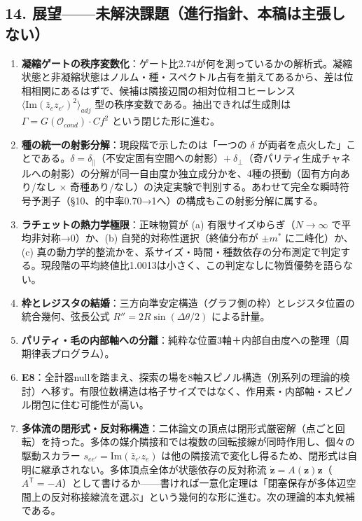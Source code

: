 \documentclass[
  a4paper,
]{ltjsarticle}
\providecommand{\tightlist}{%
  \setlength{\itemsep}{0pt}\setlength{\parskip}{0pt}}
\begin{document}
\subsection{14.
展望------未解決課題（進行指針、本稿は主張しない）}\label{ux5c55ux671bux672aux89e3ux6c7aux8ab2ux984cux9032ux884cux6307ux91ddux672cux7a3fux306fux4e3bux5f35ux3057ux306aux3044}

\begin{enumerate}
\def\labelenumi{\arabic{enumi}.}
\tightlist
\item
  \textbf{凝縮ゲートの秩序変数化}：ゲート比2.74が何を測っているかの解析式。凝縮状態と非凝縮状態はノルム・種・スペクトル占有を揃えてあるから、差は位相相関にあるはずで、候補は隣接辺間の相対位相コヒーレンス
  \(\langle \mathrm{Im}(\bar z_e z_{e'})^2\rangle_{adj}\)
  型の秩序変数である。抽出できれば生成則は
  \(\Gamma = G(\mathcal{O}_{cond})\cdot Cf^2\) という閉じた形に進む。
\item
  \textbf{種の統一の射影分解}：現段階で示したのは「一つの \(\delta\)
  が両者を点火した」ことである。\(\delta = \delta_\parallel\)（不安定固有空間への射影）\(+\ \delta_\perp\)（奇パリティ生成チャネルへの射影）の分解が同一自由度か独立成分かを、4種の摂動（固有方向あり/なし
  ×
  奇種あり/なし）の決定実験で判別する。あわせて完全な瞬時符号予測子（§10、的中率0.70→1へ）の構成もこの射影分解に属する。
\item
  \textbf{ラチェットの熱力学極限}：正味物質が (a)
  有限サイズゆらぎ（\(N\to\infty\) で平均非対称→0）か、(b)
  自発的対称性選択（終値分布が \(\pm m^*\) に二峰化）か、(c)
  真の動力学的整流かを、系サイズ・時間・種数依存の分布測定で判定する。現段階の平均終値比1.0013は小さく、この判定なしに物質優勢を語らない。
\item
  \textbf{枠とレジスタの結婚}：三方向準安定構造（グラフ側の枠）とレジスタ位置の統合幾何、弦長公式
  \(R''=2R\sin(\Delta\theta/2)\) による計量。
\item
  \textbf{パリティ・毛の内部軸への分離}：純粋な位置3軸＋内部自由度への整理（周期律表プログラム）。
\item
  \textbf{E8}：全計器nullを踏まえ、探索の場を8軸スピノル構造（別系列の理論的検討）へ移す。有限位数構造は格子サイズではなく、作用素・内部軸・スピノル閉包に住む可能性が高い。
\item
  \textbf{多体流の閉形式・反対称構造}：二体論文の頂点は閉形式厳密解（点ごと回転）を持った。多体の媒介隣接和では複数の回転接線が同時作用し、個々の駆動スカラー
  \(s_{ee'}=\mathrm{Im}(\bar z_{e'}z_e)\)
  は他の隣接流で変化し得るため、閉形式は自明に継承されない。多体頂点全体が状態依存の反対称流
  \(\dot{\mathbf z}=A(\mathbf z)\mathbf z\)（\(A^{\mathsf T}=-A\)）として書けるか------書ければ一意化定理は「閉塞保存が多体辺空間上の反対称接線流を選ぶ」という幾何的な形に進む。次の理論的本丸候補である。
\end{enumerate}
\end{document}
